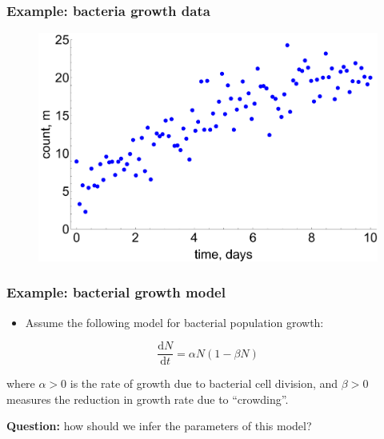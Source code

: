 \documentclass[handout]{beamer}
\begin{document}
\begin{frame}
	\frametitle{Example: bacteria growth data}
	
	\begin{figure}[ht]
		\centerline{\includegraphics[width=1\textwidth]{figures/lec7_odeSingle.pdf}}
	\end{figure}
	
\end{frame}

\begin{frame}
	\frametitle{Example: bacterial growth model}
	\begin{itemize}
		\item<2-> Assume the following model for bacterial population growth:
	\end{itemize}
	
	\begin{equation}
	\frac{\mathrm{d}N}{\mathrm{d}t} = \alpha N (1-\beta N)
	\end{equation}
	
	where $\alpha>0$ is the rate of growth due to bacterial cell division, and $\beta>0$ measures the reduction in growth rate due to ``crowding''. 
	
	\textbf{Question:} how should we infer the parameters of this model?
	
\end{frame}
\end{document}
